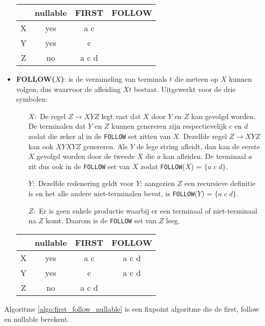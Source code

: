 \begin{itemize}
	\begin{table}[h]
	\centering
	\begin{tabular}{c | c c c}
			& nullable & FIRST & FOLLOW \\
			\hline
			X & yes & a c & \\
			Y & yes & c & \\
			Z & no & a c d & 
		\end{tabular}
	\end{table}
	
	\item \textbf{FOLLOW($X$)}: is de verzameling van terminals $t$ die meteen op $X$ kunnen volgen, dus waarvoor de afleiding $Xt$ bestaat. 
	Uitgewerkt voor de drie symbolen:
	\begin{itemize}
		\item[$X:$]  De regel $Z \rightarrow X Y Z$ legt vast dat $X$ door $Y$ en $Z$ kan gevolgd worden. De terminalen dat $Y$ en $Z$ kunnen genereren zijn respectievelijk $c$ en $d$ zodat die zeker al in de \texttt{FOLLOW} set zitten van $X$. Dezelfde regel $Z \rightarrow X Y Z$ kan ook $X Y X Y Z$ genereren. 
		Als $Y$ de lege string afleidt, dan kan de eerste $X$ gevolgd worden door de tweede $X$ die $a$ kan afleiden. De terminaal $a$ zit dus ook in de \texttt{FOLLOW} set van $X$ zodat \texttt{FOLLOW}($X$) = $\{a\;c\;d\}$.
		
		
		\item[$Y:$] Dezelfde redenering geldt voor $Y$: aangezien $Z$ een recursieve definitie is en het alle andere niet-terminalen bevat, is \texttt{FOLLOW}($Y$) = $\{a\;c\;d\}$. 
		\item[$Z:$] Er is geen enkele productie waarbij er een terminaal of niet-terminaal na $Z$ komt. Daarom is de \texttt{FOLLOW} set van $Z$ leeg.
	\end{itemize}
	\begin{table}[h]
		\centering
		\begin{tabular}{c | c c c}
			& nullable & FIRST & FOLLOW \\
			\hline
			X & yes & a c & a c d\\
			Y & yes & c & a c d\\
			Z & no & a c d & 
		\end{tabular}
	\end{table}
\end{itemize}

Algoritme \ref{algo:first_follow_nullable} is een fixpoint algoritme die de first, follow en nullable berekent.

